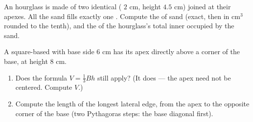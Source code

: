 \begin{exercise}[$\star\star$]\label{exo:g8:solids:10}
An hourglass is made of two identical  ( $2$ cm, height
$4.5$ cm) joined at their apexes. All the sand fills exactly one
. Compute the  of sand (exact, then in cm$^3$ rounded to
the tenth), and the  of the hourglass's total inner 
occupied by the sand.
\end{exercise}

\begin{exercise}[$\star\star\star$]\label{exo:g8:solids:11}
A square-based  with base side $6$ cm has its apex directly
above a corner of the base, at height $8$ cm.
\begin{enumerate}
  \item Does the formula $V = \frac13 Bh$ still apply? (It does ---
        the apex need not be centered. Compute $V$.)
  \item Compute the length of the longest lateral edge, from the apex
        to the opposite corner of the base (two Pythagoras steps: the
        base diagonal first).
\end{enumerate}
\end{exercise}
